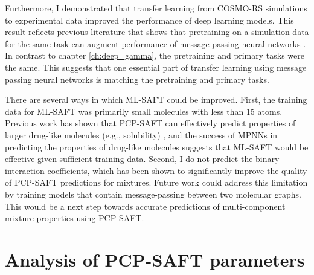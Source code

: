 Furthermore, I demonstrated that transfer learning from COSMO-RS simulations to experimental data improved the performance of deep learning models. This result reflects previous literature that shows that pretraining on a simulation data for the same task can augment performance of message passing neural networks \cite{Vermeire2021}. In contrast to chapter \ref{ch:deep_gamma}, the pretraining and primary tasks were the  same. This suggests that one essential part of transfer learning using message passing neural networks is matching the pretraining and primary tasks.

There are several ways in which ML-SAFT could be improved. First, the training data for ML-SAFT was primarily small molecules with less than 15 atoms. Previous work has shown that PCP-SAFT can effectively predict properties of larger drug-like molecules (e.g., solubility) \cite{Klajmon2020}, and the success of MPNNs in predicting the properties of drug-like molecules suggests that ML-SAFT would be effective given sufficient training data. Second, I do not predict the binary interaction coefficients, which has been shown to significantly improve the quality of PCP-SAFT predictions for mixtures. Future work could address this limitation by training models that contain message-passing between two molecular graphs. This would be a next step towards accurate predictions of multi-component mixture properties using PCP-SAFT.

\section{Analysis of PCP-SAFT parameters}\label{app:sensitivity}





